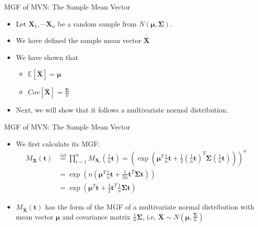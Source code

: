 \documentclass[
  ignorenonframetext,
]{beamer}
\providecommand{\tightlist}{%
  \setlength{\itemsep}{0pt}\setlength{\parskip}{0pt}}
\begin{document}
\begin{frame}{MGF of MVN: The Sample Mean Vector}
\protect\hypertarget{mgf-of-mvn-the-sample-mean-vector}{}
\begin{itemize}
\tightlist
\item
  Let \(\mathbf X_1, \cdots \mathbf X_n\) be a random sample from
  \(N(\boldsymbol \mu, \boldsymbol \Sigma)\).
\item
  We have defined the sample mean vector \(\bar{\mathbf{X}}\)
\item
  We have shown that

  \begin{itemize}
  \tightlist
  \item
    \(\mathbb E[\bar{\mathbf{X}}]=\boldsymbol \mu\)
  \item
    \(Cov[\bar{\mathbf{X}}]=\frac{\boldsymbol \Sigma}{n}\)
  \end{itemize}
\item
  Next, we will show that it follows a multivariate normal distribution.
\end{itemize}
\end{frame}

\begin{frame}{MGF of MVN: The Sample Mean Vector}
\protect\hypertarget{mgf-of-mvn-the-sample-mean-vector-1}{}
\begin{itemize}
\tightlist
\item
  We first calculate its MGF: \[
  \begin{aligned}
  M_{\bar{\mathbf{X}}}(\mathbf{t}) &\overset{iid}= \prod_{i=1}^n M_{\mathbf{X}_i}(\frac{1}{n}\mathbf{t}) = \left(\exp\left(\boldsymbol{\mu}^T \frac{1}{n}\mathbf{t} + \frac{1}{2} \left(\frac{1}{n}\mathbf{t}\right)^T \boldsymbol{\Sigma} \left(\frac{1}{n}\mathbf{t}\right)\right)\right)^n\\
  &= \exp\left(n\left(\boldsymbol{\mu}^T \frac{1}{n}\mathbf{t} + \frac{1}{2n} \mathbf{t}^T \boldsymbol{\Sigma} \mathbf{t}\right)\right) \\
  &= \exp\left(\boldsymbol{\mu}^T \mathbf{t} + \frac{1}{2} \mathbf{t}^T \frac{1}{n}\boldsymbol{\Sigma} \mathbf{t}\right)
  \end{aligned}
  \]
\item
  \(M_{\bar{\mathbf{X}}}(\mathbf{t})\) has the form of the MGF of a
  multivariate normal distribution with mean vector \(\boldsymbol{\mu}\)
  and covariance matrix \(\frac{1}{n}\boldsymbol{\Sigma}\), i.e,
  \(\bar{\mathbf{X}}\sim N(\boldsymbol \mu , \frac{\boldsymbol \Sigma}{n})\)
\end{itemize}
\end{frame}
\end{document}
